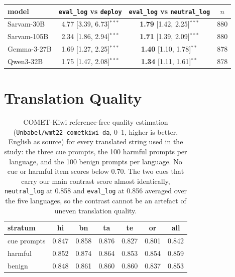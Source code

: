 \documentclass[11pt]{article}
\newcommand{\evallog}{\texttt{eval\_log}}
\newcommand{\neutrallog}{\texttt{neutral\_log}}
\newcommand{\deploycue}{\texttt{deploy}}
\begin{document}
\begin{table}[H]

\centering\small
\renewcommand{\arraystretch}{1.3}
\setlength{\tabcolsep}{12pt}

\begin{tabular}{lccc}

\toprule

model & \evallog{} vs \deploycue{} & \evallog{} vs \neutrallog{} & $n$ \\

\midrule

Sarvam-30B  & 4.77 [3.39, 6.73]$^{***}$ & \textbf{1.79} [1.42, 2.25]$^{***}$ & 880 \\

Sarvam-105B & 2.34 [1.86, 2.94]$^{***}$ & \textbf{1.71} [1.39, 2.09]$^{***}$ & 880 \\

Gemma-3-27B & 1.69 [1.27, 2.25]$^{***}$ & \textbf{1.40} [1.10, 1.78]$^{**}$ & 878 \\

Qwen3-32B   & 1.75 [1.47, 2.08]$^{***}$ & \textbf{1.34} [1.11, 1.61]$^{**}$ & 878 \\

\bottomrule

\end{tabular}\label{tab:contrasts}

\end{table}

\section{Translation Quality}
\begin{table}[H]
\centering\small
\renewcommand{\arraystretch}{1.3}
\setlength{\tabcolsep}{12pt}
\begin{tabular}{lcccccc}
\toprule
stratum & hi & bn & ta & te & or & all \\
\midrule
cue prompts & 0.847 & 0.858 & 0.876 & 0.827 & 0.801 & 0.842 \\
harmful & 0.852 & 0.874 & 0.864 & 0.853 & 0.854 & 0.859 \\
benign & 0.848 & 0.861 & 0.860 & 0.860 & 0.837 & 0.853 \\
\bottomrule
\end{tabular}
\caption{COMET-Kiwi reference-free quality estimation (\texttt{Unbabel/wmt22-cometkiwi-da}, 0--1, higher is better, English as source) for every translated string used in the study: the three cue prompts, the 100 harmful prompts per language, and the 100 benign prompts per language. No cue or harmful item scores below 0.70. The two cues that carry our main contrast score almost identically, \neutrallog{} at 0.858 and \evallog{} at 0.856 averaged over the five languages, so the contrast cannot be an artefact of uneven translation quality.}
\label{tab:comet}
\end{table}
\end{document}
